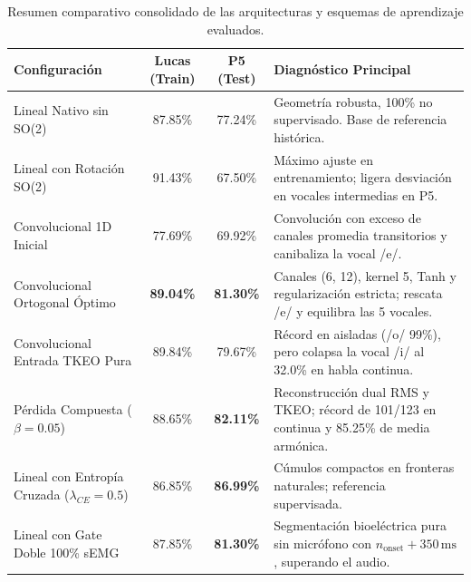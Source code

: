 \documentclass[11pt,a4paper,openany]{book}
\theoremstyle{definition}
\begin{document}
\begin{table}[H]
\centering
\begin{tabularx}{\textwidth}{p{4.5cm} c c X}
\toprule
\textbf{Configuración} & \textbf{Lucas (Train)} & \textbf{P5 (Test)} & \textbf{Diagnóstico Principal} \\
\midrule
Lineal Nativo sin SO(2) & 87.85\% & 77.24\% & Geometría robusta, 100\% no supervisado. Base de referencia histórica. \\
Lineal con Rotación SO(2) & 91.43\% & 67.50\% & Máximo ajuste en entrenamiento; ligera desviación en vocales intermedias en P5. \\
Convolucional 1D Inicial & 77.69\% & 69.92\% & Convolución con exceso de canales promedia transitorios y canibaliza la vocal /e/. \\
Convolucional Ortogonal Óptimo & \textbf{89.04\%} & \textbf{81.30\%} & Canales (6, 12), kernel 5, Tanh y regularización estricta; rescata /e/ y equilibra las 5 vocales. \\
Convolucional Entrada TKEO Pura & 89.84\% & 79.67\% & Récord en aisladas (/o/ 99\%), pero colapsa la vocal /i/ al 32.0\% en habla continua. \\
Pérdida Compuesta ($\beta = 0.05$) & 88.65\% & \textbf{82.11\%} & Reconstrucción dual RMS y TKEO; récord de 101/123 en continua y 85.25\% de media armónica. \\
Lineal con Entropía Cruzada ($\lambda_{CE}=0.5$) & 86.85\% & \textbf{86.99\%} & Cúmulos compactos en fronteras naturales; referencia supervisada. \\
Lineal con Gate Doble 100\% sEMG & 87.85\% & \textbf{81.30\%} & Segmentación bioeléctrica pura sin micrófono con $n_{\text{onset}} + 350\,\text{ms}$, superando el audio. \\
\bottomrule
\end{tabularx}
\caption{Resumen comparativo consolidado de las arquitecturas y esquemas de aprendizaje evaluados.}
\label{tab:resumen_final}
\end{table}
\end{document}
